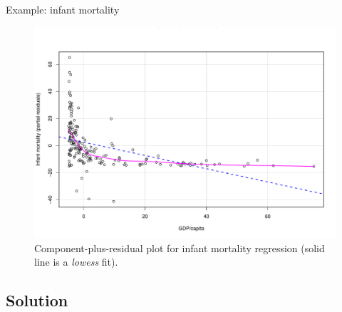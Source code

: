 \documentclass[12pt,english,pdf,xcolor=dvipsnames,aspectratio=169,handout]{beamer}\usepackage[]{graphicx}\usepackage[]{xcolor}
\begin{document}
\begin{frame}{Example: infant mortality}



\begin{figure}
  \centering
  \includegraphics[scale=0.375]{../04-graphs/01-01.pdf}
  \caption{\label{fig:fig-02} Component-plus-residual plot for infant mortality regression (solid line is a \textit{lowess} fit).}
\end{figure}

\end{frame}



\subsection{Solution}
\end{document}
